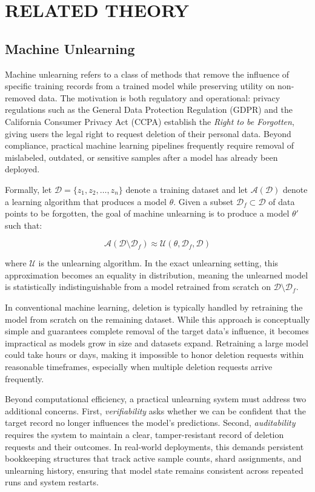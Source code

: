 \chapter{RELATED THEORY}

\section{Machine Unlearning}
Machine unlearning refers to a class of methods that remove the influence of specific training records from a trained model while preserving utility on non-removed data. The motivation is both regulatory and operational: privacy regulations such as the General Data Protection Regulation (GDPR) and the California Consumer Privacy Act (CCPA) establish the \textit{Right to be Forgotten}, giving users the legal right to request deletion of their personal data. Beyond compliance, practical machine learning pipelines frequently require removal of mislabeled, outdated, or sensitive samples after a model has already been deployed.

Formally, let $\mathcal{D} = \{z_1, z_2, \ldots, z_n\}$ denote a training dataset and let $\mathcal{A}(\mathcal{D})$ denote a learning algorithm that produces a model $\theta$. Given a subset $\mathcal{D}_f \subset \mathcal{D}$ of data points to be forgotten, the goal of machine unlearning is to produce a model $\theta'$ such that:

\[
\mathcal{A}(\mathcal{D} \setminus \mathcal{D}_f) \approx \mathcal{U}(\theta, \mathcal{D}_f, \mathcal{D})
\]

where $\mathcal{U}$ is the unlearning algorithm. In the exact unlearning setting, this approximation becomes an equality in distribution, meaning the unlearned model is statistically indistinguishable from a model retrained from scratch on $\mathcal{D} \setminus \mathcal{D}_f$.

In conventional machine learning, deletion is typically handled by retraining the model from scratch on the remaining dataset. While this approach is conceptually simple and guarantees complete removal of the target data's influence, it becomes impractical as models grow in size and datasets expand. Retraining a large model could take hours or days, making it impossible to honor deletion requests within reasonable timeframes, especially when multiple deletion requests arrive frequently.

Beyond computational efficiency, a practical unlearning system must address two additional concerns. First, \textit{verifiability} asks whether we can be confident that the target record no longer influences the model's predictions. Second, \textit{auditability} requires the system to maintain a clear, tamper-resistant record of deletion requests and their outcomes. In real-world deployments, this demands persistent bookkeeping structures that track active sample counts, shard assignments, and unlearning history, ensuring that model state remains consistent across repeated runs and system restarts.

